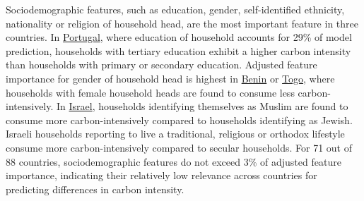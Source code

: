 \documentclass[12pt, a4paper]{article}
\begin{document}
Sociodemographic features, such as education, gender, self-identified ethnicity, nationality or religion of household head, are the most important feature in three countries. In \hyperref[fig:5b_PRT]{Portugal}, where education of household accounts for 29\% of model prediction, households with tertiary education exhibit a higher carbon intensity than households with primary or secondary education. Adjusted feature importance for gender of household head is highest in \hyperref[fig:5b_BEN]{Benin} or \hyperref[fig:5b_TGO]{Togo}, where households with female household heads are found to consume less carbon-intensively. In \hyperref[fig:5b_ISR]{Israel}, households identifying themselves as Muslim are found to consume more carbon-intensively compared to households identifying as Jewish. Israeli households reporting to live a traditional, religious or orthodox lifestyle consume more carbon-intensively compared to secular households. For 71 out of 88 countries, sociodemographic features do not exceed 3\% of adjusted feature importance, indicating their relatively low relevance across countries for predicting differences in carbon intensity.
\end{document}
